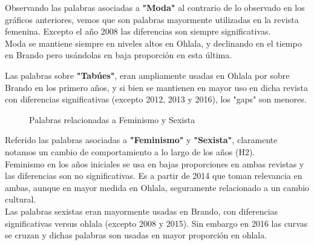 \documentclass[a4paper]{article}
\begin{document}
Observando las palabras asociadas a \textbf{"Moda"} al contrario de lo observado en los gr\'aficos anteriores, vemos que son palabras mayormente utilizadas en la revista femenina. Excepto el a\~no 2008 las diferencias son siempre significativas.\\
Moda se mantiene siempre en niveles altos en Ohlala, y declinando en el tiempo en Brando pero us\'andolas en baja proporci\'on en esta \'ultima.

Las palabras sobre \textbf{"Tab\'ues"}, eran ampliamente usadas en Ohlala por sobre Brando en los primero a\~nos, y si bien se mantienen en mayor uso en dicha revista con diferencias significativas (excepto 2012, 2013 y 2016), los "gaps" son menores.

\begin{figure}[H]
\centering
{}
\caption{Palabras relacionadas a Feminismo y Sexista} \label{fig:femysexista}
\end{figure}

Referido las palabras asociadas a \textbf{"Feminismo"} y \textbf{"Sexista"}, claramente notamos un cambio de comportamiento a lo largo de los a\~nos (H2).\\
Feminismo en los a\~nos iniciales se usa en bajas proporciones en ambas revistas y las diferencias son no significativas. Es a partir de 2014 que toman relevancia en ambas, aunque en mayor medida en Ohlala, seguramente relacionado a un cambio cultural.\\
Las palabras sexistas eran mayormente usadas en Brando, con diferencias significativas versus ohlala (excepto 2008 y 2015). Sin embargo en 2016 las curvas se cruzan y dichas palabras son usadas en mayor proporci\'on en ohlala. 
\end{document}
